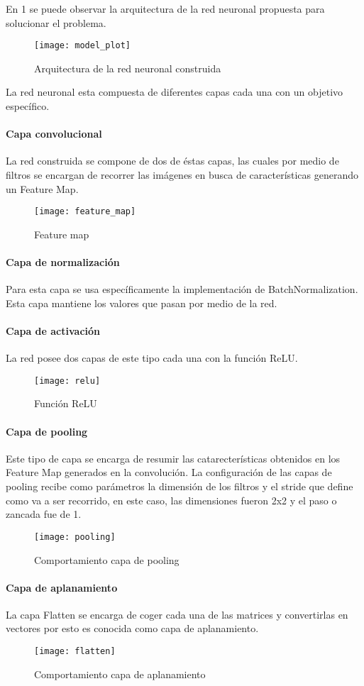 \documentclass{article}
\begin{document}
En 1 se puede observar la arquitectura de la red neuronal propuesta para solucionar el problema.
\begin{figure}[H]
  \caption{Arquitectura de la red neuronal construida}
  \centering
  \texttt{[image: model\_plot]}
\end{figure}
La red neuronal esta compuesta de diferentes capas cada una con un objetivo espec\'ifico.
\paragraph{Capa convolucional} La red construida se compone de dos de \'estas capas, las cuales por medio de filtros se encargan de recorrer las im\'agenes en busca de caracter\'isticas generando un Feature Map.
\begin{figure}[H]
  \caption{Feature map}
  \centering
  \texttt{[image: feature\_map]}
\end{figure}
\paragraph{Capa de normalizaci\'on} Para esta capa se usa espec\'ificamente la implementaci\'on de BatchNormalization. Esta capa mantiene los valores que pasan por medio de la red.
\paragraph{Capa de activaci\'on} La red posee dos capas de este tipo cada una con la funci\'on ReLU.
\begin{figure}[H]
  \caption{Funci\'on ReLU}
  \centering
  \texttt{[image: relu]}
\end{figure}
\paragraph{Capa de pooling} 
Este tipo de capa se encarga de resumir las catarecter\'isticas
obtenidos en los Feature Map generados en la convoluci\'on. 
La configuraci\'on de las capas de pooling recibe como par\'ametros la dimensi\'on de los filtros 
y el stride que define como va a ser recorrido, en este caso, las dimensiones fueron 2x2 y el paso o zancada fue de 1. 
\begin{figure}[H]
  \caption{Comportamiento capa de pooling}
  \centering
  \texttt{[image: pooling]}
\end{figure}
\paragraph{Capa de aplanamiento} La capa Flatten se encarga de coger cada una de las matrices y convertirlas en vectores por esto es conocida como capa de aplanamiento.
\begin{figure}[H]
  \caption{Comportamiento capa de aplanamiento}
  \centering
  \texttt{[image: flatten]}
\end{figure}
\end{document}
